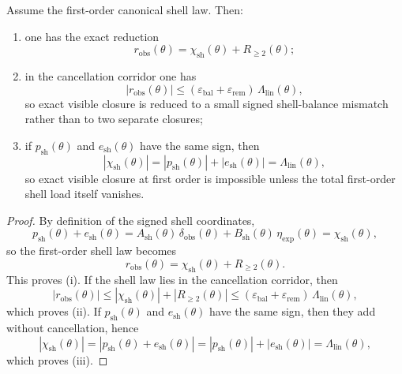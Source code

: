 \begin{theorem}
Assume the first-order canonical shell law. Then:
\begin{enumerate}[leftmargin=2em,label=(\roman*)]
\item one has the exact reduction
\[
  r_{\mathrm{obs}}(\theta)=\chi_{\mathrm{sh}}(\theta)+R_{\ge 2}(\theta);
\]
\item in the cancellation corridor one has
\[
  |r_{\mathrm{obs}}(\theta)|
  \le (\varepsilon_{\mathrm{bal}}+\varepsilon_{\mathrm{rem}})\,\Lambda_{\mathrm{lin}}(\theta),
\]
so exact visible closure is reduced to a small signed shell-balance mismatch rather than to two separate closures;
\item if $p_{\mathrm{sh}}(\theta)$ and $e_{\mathrm{sh}}(\theta)$ have the same sign, then
\[
  |\chi_{\mathrm{sh}}(\theta)|=|p_{\mathrm{sh}}(\theta)|+|e_{\mathrm{sh}}(\theta)|=\Lambda_{\mathrm{lin}}(\theta),
\]
so exact visible closure at first order is impossible unless the total first-order shell load itself vanishes.
\end{enumerate}
\end{theorem}

\begin{proof}
By definition of the signed shell coordinates,
\[
  p_{\mathrm{sh}}(\theta)+e_{\mathrm{sh}}(\theta)=A_{\mathrm{sh}}(\theta)\,\delta_{\mathrm{obs}}(\theta)+B_{\mathrm{sh}}(\theta)\,\eta_{\mathrm{exp}}(\theta)=\chi_{\mathrm{sh}}(\theta),
\]
so the first-order shell law becomes
\[
  r_{\mathrm{obs}}(\theta)=\chi_{\mathrm{sh}}(\theta)+R_{\ge 2}(\theta).
\]
This proves (i). If the shell law lies in the cancellation corridor, then
\[
  |r_{\mathrm{obs}}(\theta)|\le |\chi_{\mathrm{sh}}(\theta)|+|R_{\ge 2}(\theta)|
  \le (\varepsilon_{\mathrm{bal}}+\varepsilon_{\mathrm{rem}})\,\Lambda_{\mathrm{lin}}(\theta),
\]
which proves (ii). If $p_{\mathrm{sh}}(\theta)$ and $e_{\mathrm{sh}}(\theta)$ have the same sign, then they add without cancellation, hence
\[
  |\chi_{\mathrm{sh}}(\theta)|=|p_{\mathrm{sh}}(\theta)+e_{\mathrm{sh}}(\theta)|=|p_{\mathrm{sh}}(\theta)|+|e_{\mathrm{sh}}(\theta)|=\Lambda_{\mathrm{lin}}(\theta),
\]
which proves (iii).
\end{proof}

